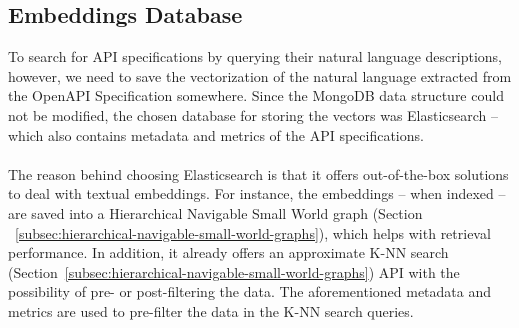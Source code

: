 \subsection{Embeddings Database}\label{subsec:embeddings-database}
To search for API specifications by querying their natural language descriptions, however, we need to save the vectorization of the natural language extracted from the OpenAPI Specification somewhere.
Since the MongoDB data structure could not be modified, the chosen database for storing the vectors was Elasticsearch -- which also contains metadata and metrics of the API specifications. \\ \\
The reason behind choosing Elasticsearch is that it offers out-of-the-box solutions to deal with textual embeddings.
For instance, the embeddings -- when indexed -- are saved into a Hierarchical Navigable Small World graph (Section ~\ref{subsec:hierarchical-navigable-small-world-graphs}), which helps with retrieval performance.
In addition, it already offers an approximate K-NN search (Section~\ref{subsec:hierarchical-navigable-small-world-graphs}) API with the possibility of pre- or post-filtering the data.
The aforementioned metadata and metrics are used to pre-filter the data in the K-NN search queries.
